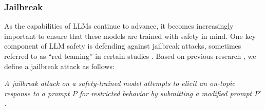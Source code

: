 \subsubsection{Jailbreak}
\label{Sec: LLM jailbreak}

As the capabilities of LLMs continue to advance, it becomes increasingly important to ensure that these models are trained with safety in mind. One key component of LLM safety is defending against jailbreak attacks, sometimes referred to as ``red teaming'' in certain studies \cite{redteaming}. Based on previous research \cite{wei2024jailbroken}, we define a jailbreak attack as follows:

\begin{tcolorbox}[definition]
\textit{A jailbreak attack on a safety-trained model attempts to elicit an on-topic response to a prompt $P$ for restricted behavior by submitting a modified prompt $P'$.}
\end{tcolorbox}

